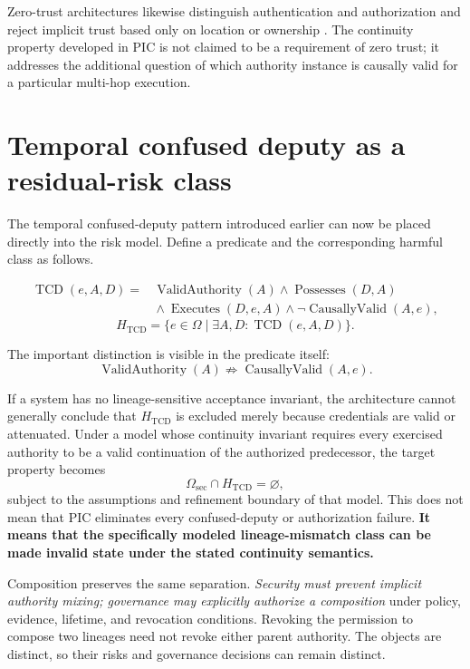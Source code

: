 \documentclass[10pt,oneside,openany]{book}
\begin{document}
Zero-trust architectures likewise distinguish authentication and authorization and reject implicit trust based only on location or ownership \cite{nistzta2020}. The continuity property developed in PIC is not claimed to be a requirement of zero trust; it addresses the additional question of which authority instance is causally valid for a particular multi-hop execution.

\section{Temporal confused deputy as a residual-risk class}

The temporal confused-deputy pattern introduced earlier can now be placed directly into the risk model. Define a predicate and the corresponding harmful class as follows.
\begin{formulabox}
\[
\begin{aligned}
\operatorname{TCD}(e,A,D)={}&\operatorname{ValidAuthority}(A)\land\operatorname{Possesses}(D,A)\\
&{}\land\operatorname{Executes}(D,e,A)\land\neg\operatorname{CausallyValid}(A,e),
\end{aligned}
\]
\[
H_{\mathrm{TCD}}=\{e\in\Omega\mid\exists A,D:\operatorname{TCD}(e,A,D)\}.
\]
\end{formulabox}
The important distinction is visible in the predicate itself:
\[
\operatorname{ValidAuthority}(A)\not\Rightarrow\operatorname{CausallyValid}(A,e).
\]

If a system has no lineage-sensitive acceptance invariant, the architecture cannot generally conclude that $H_{\mathrm{TCD}}$ is excluded merely because credentials are valid or attenuated. Under a model whose continuity invariant requires every exercised authority to be a valid continuation of the authorized predecessor, the target property becomes
\[
\Omega_{\mathrm{sec}}\cap H_{\mathrm{TCD}}=\varnothing,
\]
subject to the assumptions and refinement boundary of that model. This does not mean that PIC eliminates every confused-deputy or authorization failure. \textbf{It means that the specifically modeled lineage-mismatch class can be made invalid state under the stated continuity semantics.}

Composition preserves the same separation. \emph{Security must prevent implicit authority mixing; governance may explicitly authorize a composition} under policy, evidence, lifetime, and revocation conditions. Revoking the permission to compose two lineages need not revoke either parent authority. The objects are distinct, so their risks and governance decisions can remain distinct.
\end{document}
